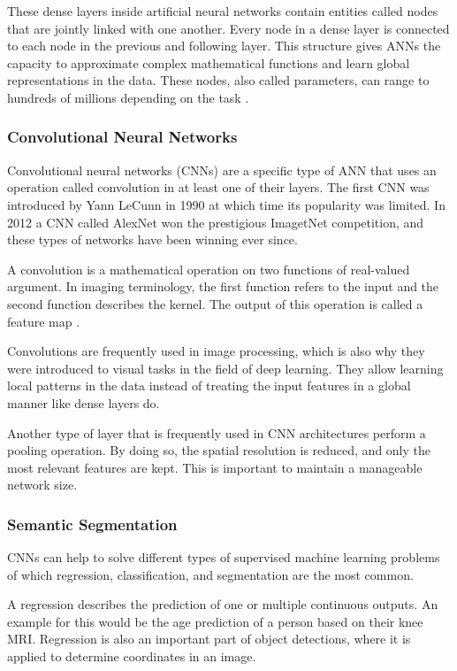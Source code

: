 These dense layers inside artificial neural networks contain entities called nodes that are jointly linked with one another. Every node in a dense layer is connected to each node in the previous and following layer. This structure gives ANNs the capacity to approximate complex mathematical functions and learn global representations in the data. These nodes, also called parameters, can range to hundreds of millions depending on the task \cite{Simonyan2014a}.

\subsubsection{Convolutional Neural Networks}

Convolutional neural networks (CNNs) are a specific type of ANN that uses an operation called convolution in at least one of their layers. The first CNN was introduced by Yann LeCunn \cite{LeCun1990} in 1990 at which time its popularity was limited. In 2012 a CNN called AlexNet \cite{Krizhevsky} won the prestigious ImagetNet competition, and these types of networks have been winning ever since.

A convolution is a mathematical operation on two functions of real-valued argument. In imaging terminology, the first function refers to the input and the second function describes the kernel. The output of this operation is called a feature map \cite{Goodfellow2016}.

Convolutions are frequently used in image processing, which is also why they were introduced to visual tasks in the field of deep learning. They allow learning local patterns in the data instead of treating the input features in a global manner like dense layers do.

Another type of layer that is frequently used in CNN architectures perform a pooling operation. By doing so, the spatial resolution is reduced, and only the most relevant features are kept. This is important to maintain a manageable network size.

\subsubsection{Semantic Segmentation}

CNNs can help to solve different types of supervised machine learning problems of which regression, classification, and segmentation are the most common.

A regression describes the prediction of one or multiple continuous outputs. An example for this would be the age prediction of a person based on their knee MRI. Regression is also an important part of object detections, where it is applied to determine coordinates in an image.

